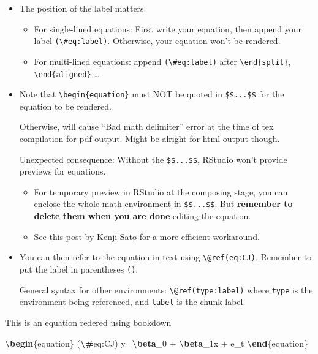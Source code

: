 \documentclass[
  a4paper,
  twoside,
  openright]{book}
\newenvironment{Shaded}{\begin{snugshade}}{\end{snugshade}}
\newcommand{\ExtensionTok}[1]{#1}
\newcommand{\KeywordTok}[1]{\textcolor[rgb]{0.13,0.29,0.53}{\textbf{#1}}}
\newcommand{\NormalTok}[1]{#1}
\newcommand{\SpecialCharTok}[1]{\textcolor[rgb]{0.81,0.36,0.00}{\textbf{#1}}}
\newcommand{\SpecialStringTok}[1]{\textcolor[rgb]{0.31,0.60,0.02}{#1}}
\providecommand{\tightlist}{%
  \setlength{\itemsep}{0pt}\setlength{\parskip}{0pt}}
\theoremstyle{definition}
\theoremstyle{definition}
\theoremstyle{definition}
\theoremstyle{definition}
\theoremstyle{remark}
\begin{document}
\begin{itemize}
\item
  {The position of the label matters}.

  \begin{itemize}
  \tightlist
  \item
    For single-lined equations: First write your equation, then append your label \texttt{(\textbackslash{}\#eq:label)}. Otherwise, your equation won't be rendered.
  \item
    For multi-lined equations: append \texttt{(\textbackslash{}\#eq:label)} after \texttt{\textbackslash{}end\{split\}}, \texttt{\textbackslash{}end\{aligned\}} \ldots{}
  \end{itemize}
\item
  Note that \texttt{\textbackslash{}begin\{equation\}} must {NOT be quoted in \texttt{\$\$...\$\$}} for the equation to be rendered.

  Otherwise, will cause ``Bad math delimiter'' error at the time of tex compilation for pdf output. Might be alright for html output though.

  Unexpected consequence: Without the \texttt{\$\$...\$\$}, RStudio won't provide previews for equations.

  \begin{itemize}
  \tightlist
  \item
    For temporary preview in RStudio at the composing stage, you can enclose the whole math environment in \texttt{\$\$...\$\$}. But \textbf{remember to delete them when you are done} editing the equation.
  \item
    See \href{https://www.kenjisato.jp/en/post/2017/02/cross-referenceable-equation-with-preview-in-rmarkdown/}{this post by Kenji Sato} for a more efficient workaround.
  \end{itemize}
\item
  You can then refer to the equation in text using \texttt{\textbackslash{}@ref(eq:CJ)}. Remember to put the label in parentheses \texttt{()}.

  General syntax for other environments: \texttt{\textbackslash{}@ref(type:label)} where \texttt{type} is the environment being referenced, and \texttt{label} is the chunk label.
\end{itemize}

\begin{Shaded}
\begin{Highlighting}[]
\NormalTok{This is an equation redered using bookdown}

\KeywordTok{\textbackslash{}begin}\NormalTok{\{}\ExtensionTok{equation}\NormalTok{\}}\SpecialStringTok{ (}\SpecialCharTok{\textbackslash{}\#}\SpecialStringTok{eq:CJ)}
\SpecialStringTok{y=}\SpecialCharTok{\textbackslash{}beta}\SpecialStringTok{\_0 + }\SpecialCharTok{\textbackslash{}beta}\SpecialStringTok{\_1x + e\_t}
\KeywordTok{\textbackslash{}end}\NormalTok{\{}\ExtensionTok{equation}\NormalTok{\}}
\end{Highlighting}
\end{Shaded}
\end{document}
